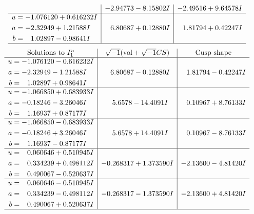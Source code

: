 \documentclass[1p]{elsarticle_modified}
\theoremstyle{definition}
\newcommand{\I}{\sqrt{-1}}
\begin{document}
$$\begin{array}{c|c|c}
 & -2.94773 - 8.15802 I & -2.49516 + 9.64578 I \\ \hline\begin{aligned}
u &= -1.076120 + 0.616232 I \\
a &= -2.32949 + 1.21588 I \\
b &= \phantom{-}1.02897 - 0.98641 I\end{aligned}
 & \phantom{-}6.80687 + 0.12880 I & \phantom{-}1.81794 + 0.42247 I\\
 \hline 
 \end{array}$$\newpage$$\begin{array}{c|c|c}  
\text{Solutions to }I^u_{1}& \I (\text{vol} + \sqrt{-1}CS) & \text{Cusp shape}\\
 \hline 
\begin{aligned}
u &= -1.076120 - 0.616232 I \\
a &= -2.32949 - 1.21588 I \\
b &= \phantom{-}1.02897 + 0.98641 I\end{aligned}
 & \phantom{-}6.80687 - 0.12880 I & \phantom{-}1.81794 - 0.42247 I \\ \hline\begin{aligned}
u &= -1.066850 + 0.683933 I \\
a &= -0.18246 - 3.26046 I \\
b &= \phantom{-}1.16937 + 0.87177 I\end{aligned}
 & \phantom{-}5.6578 - 14.4091 I & \phantom{-}0.10967 + 8.76133 I \\ \hline\begin{aligned}
u &= -1.066850 - 0.683933 I \\
a &= -0.18246 + 3.26046 I \\
b &= \phantom{-}1.16937 - 0.87177 I\end{aligned}
 & \phantom{-}5.6578 + 14.4091 I & \phantom{-}0.10967 - 8.76133 I \\ \hline\begin{aligned}
u &= \phantom{-}0.060646 + 0.510945 I \\
a &= \phantom{-}0.334239 + 0.498112 I \\
b &= \phantom{-}0.490067 - 0.520637 I\end{aligned}
 & -0.268317 + 1.373590 I & -2.13600 - 4.81420 I \\ \hline\begin{aligned}
u &= \phantom{-}0.060646 - 0.510945 I \\
a &= \phantom{-}0.334239 - 0.498112 I \\
b &= \phantom{-}0.490067 + 0.520637 I\end{aligned}
 & -0.268317 - 1.373590 I & -2.13600 + 4.81420 I\\
 \hline 
 \end{array}$$\newpage\newpage\renewcommand{\arraystretch}{1}
\end{document}

